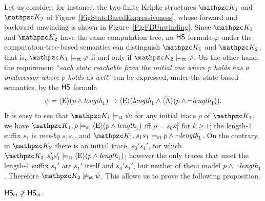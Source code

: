 Let us consider, for instance, the two finite Kripke structures $\Ku_1$ and $\Ku_2$ of Figure~\ref{FigStateBasedExpressiveness}, whose forward and backward unwinding is shown in Figure~\ref{FigFBUnwinding}. Since $\Ku_1$ and $\Ku_2$ have the same computation tree, no $\text{\sffamily HS}$ formula $\varphi$ under the computation-tree-based semantics can distinguish $\Ku_1$ and $\Ku_2$, that is, $\Ku_1\models_\LinearPast\varphi$ if and only if $\Ku_2\models_\LinearPast\varphi$. On the other hand, the requirement ``\emph{each state reachable from the initial one where $p$ holds has a predecessor where $p$ holds as well}'' can be expressed, under the state-based semantics, by the $\text{\sffamily HS}$ formula
\[
\psi= \operatorname{\langle E\rangle}(p\wedge \textit{length}_1) \rightarrow \operatorname{\langle E\rangle}(\textit{length}_1 \wedge \operatorname{\langle \overline{A}\rangle}(p\wedge \neg\textit{length}_1)).
\]
It is easy to see that $\Ku_1\models_\stat\psi$: for any initial trace $\rho$ of $\Ku_1$,
we have $\Ku_1,\rho\models_\stat \hsE(p\wedge \Length_1)$ iff $\rho=s_0s_1^k$ for $k\geq 1$; the length-1 suffix $s_1$ is \emph{met-by} $s_1s_1$, and $\Ku_1,s_1s_1\models_\stat p\wedge \neg\Length_1$.
%
On the contrary, in $\Ku_2$ there is an initial trace, $s_0's_1'$, for which $\Ku_2,s_0's_1'\models_\stat\hsE(p\wedge \Length_1)$; however the only traces that meet the length-1 suffix $s_1'$ are $s_1'$ itself and $s_0's_1'$, but neither of them model $p\wedge \neg\textit{length}_1$.
Therefore $\Ku_2\not\models_\stat\psi$. 
This allows us to prove the following proposition.

\begin{proposition}\label{Prop:StateBasedExpressiveness} 
$\text{\sffamily HS}_{\mathsf{ct}} \not \geq \text{\sffamily HS}_{\mathsf{st}}$.
\end{proposition}

